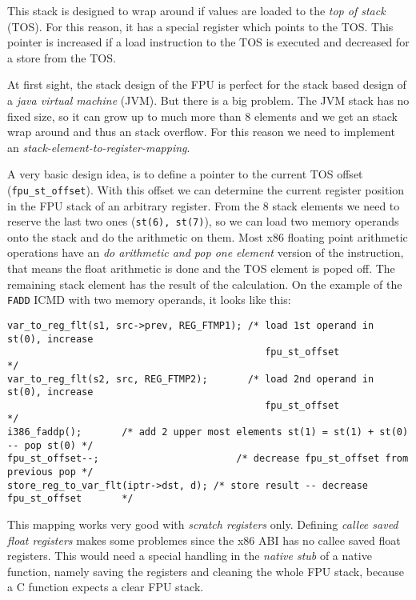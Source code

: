 This stack is designed to wrap around if values are loaded to the
\textit{top of stack} (TOS). For this reason, it has a special register which
points to the TOS. This pointer is increased if a load instruction to
the TOS is executed and decreased for a store from the TOS.

At first sight, the stack design of the FPU is perfect for the stack
based design of a \textit{java virtual machine} (JVM). But there is a
big problem. The JVM stack has no fixed size, so it can grow up to
much more than 8 elements and we get an stack wrap around and thus an
stack overflow. For this reason we need to implement an
\textit{stack-element-to-register-mapping}.

A very basic design idea, is to define a pointer to the current TOS
offset (\texttt{fpu\_st\_offset}). With this offset we can determine
the current register position in the FPU stack of an arbitrary
register.  From the 8 stack elements we need to reserve the last two
ones (\texttt{st(6), st(7)}), so we can load two memory operands onto
the stack and do the arithmetic on them. Most x86 floating point
arithmetic operations have an \textit{do arithmetic and pop one
element} version of the instruction, that means the float arithmetic
is done and the TOS element is poped off. The remaining stack element
has the result of the calculation. On the example of the \texttt{FADD}
ICMD with two memory operands, it looks like this:

\begin{verbatim}
var_to_reg_flt(s1, src->prev, REG_FTMP1); /* load 1st operand in st(0), increase
                                             fpu_st_offset                          */
var_to_reg_flt(s2, src, REG_FTMP2);       /* load 2nd operand in st(0), increase
                                             fpu_st_offset                          */
i386_faddp();       /* add 2 upper most elements st(1) = st(1) + st(0) -- pop st(0) */
fpu_st_offset--;                        /* decrease fpu_st_offset from previous pop */
store_reg_to_var_flt(iptr->dst, d); /* store result -- decrease fpu_st_offset       */
\end{verbatim}

This mapping works very good with \textit{scratch registers}
only. Defining \textit{callee saved float registers} makes some
problemes since the x86 ABI has no callee saved float registers. This
would need a special handling in the \textit{native stub} of a native
function, namely saving the registers and cleaning the whole FPU
stack, because a C function expects a clear FPU stack.

